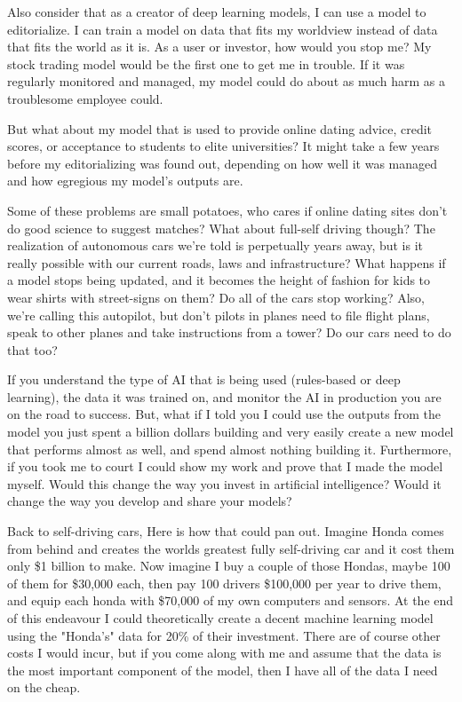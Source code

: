 Also consider that as a creator of deep learning models, I can use a model to editorialize. I can train a model on data that fits my worldview instead of data that fits the world as it is. As a user or investor, how would you stop me? My stock trading model would be the first one to get me in trouble. If it was regularly monitored and managed, my model could do about as much harm as a troublesome employee could. 

But what about my model that is used to provide online dating advice, credit scores, or acceptance to students to elite universities? It might take a few years before my editorializing was found out, depending on how well it was managed and how egregious my model's outputs are.

Some of these problems are small potatoes, who cares if online dating sites don't do good science to suggest matches? What about full-self driving though? The realization of autonomous cars we're told is perpetually years away, but is it really possible with our current roads, laws and infrastructure? What happens if a model stops being updated, and it becomes the height of fashion for kids to wear shirts with street-signs on them? Do all of the cars stop working? Also, we're calling this autopilot, but don't pilots in planes need to file flight plans, speak to other planes and take instructions from a tower? Do our cars need to do that too? 

If you understand the type of AI that is being used (rules-based or deep learning), the data it was trained on, and monitor the AI in production you are on the road to success. But, what if I told you I could use the outputs from the model you just spent a billion dollars building and very easily create a new model that performs almost as well, and spend almost nothing building it. Furthermore, if you took me to court I could show my work and prove that I made the model myself. Would this change the way you invest in artificial intelligence? Would it change the way you develop and share your models?

Back to self-driving cars, Here is how that could pan out. Imagine Honda comes from behind and creates the worlds greatest fully self-driving car and it cost them only \$1 billion to make. Now imagine I buy a couple of those Hondas, maybe 100 of them for \$30,000 each, then pay 100 drivers \$100,000 per year to drive them, and equip each honda with \$70,000 of my own computers and sensors. At the end of this endeavour I could theoretically create a decent machine learning model using the "Honda's" data for 20\% of their investment. There are of course other costs I would incur, but if you come along with me and assume that the data is the most important component of the model, then I have all of the data I need on the cheap.

